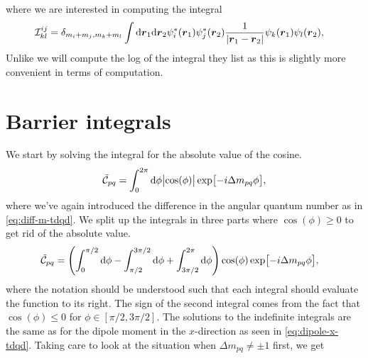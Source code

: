         where we are interested in computing the integral
        \begin{align}
            \mathcal{I}^{ij}_{kl}
            &=
            \delta_{m_i + m_j, m_k + m_l}
            \int\dd \boldsymbol{r}_1\dd \boldsymbol{r}_2
            \psi_{i}^{*}(\boldsymbol{r}_1) \psi_{j}^{*}(\boldsymbol{r}_2)
            \frac{1}{\abs{\boldsymbol{r}_1 - \boldsymbol{r}_2}}
            \psi_{k}(\boldsymbol{r}_1)\psi_{l}(\boldsymbol{r}_2),
        \end{align}
        Unlike \citeauthor{anisimovas1998energy} we will compute the log of the
        integral they list as this is slightly more convenient in terms of
        computation.

    \section{Barrier integrals}
        \label{app:barrier-integrals}
        We start by solving the integral for the absolute value of the cosine.
        \begin{align}
            \tilde{\mathcal{C}}_{pq}
            =
            \int_{0}^{2\pi} \dd \phi
            \abs{\cos(\phi)}
            \exp[-i\Delta m_{pq} \phi],
        \end{align}
        where we've again introduced the difference in the angular quantum
        number as in \autoref{eq:diff-m-tdqd}.
        We split up the integrals in three parts where $\cos(\phi) \geq 0$ to
        get rid of the absolute value.
        \begin{align}
            \tilde{\mathcal{C}}_{pq}
            &=
            \left( 
                \int_{0}^{\pi/2}
                \dd \phi
                -
                \int_{\pi/2}^{3\pi/2}
                \dd \phi
                +
                \int_{3\pi/2}^{2\pi}
                \dd \phi
             \right)
            \cos(\phi)
            \exp[-i\Delta m_{pq}\phi],
        \end{align}
        where the notation should be understood such that each integral should
        evaluate the function to its right.
        The sign of the second integral comes from the fact that $\cos(\phi)
        \leq 0$ for $\phi \in [\pi/2, 3\pi/2]$.
        The solutions to the indefinite integrals are the same as for the dipole
        moment in the $x$-direction as seen in \autoref{eq:dipole-x-tdqd}.
        Taking care to look at the situation when $\Delta m_{pq} \neq \pm 1$
        first, we get
